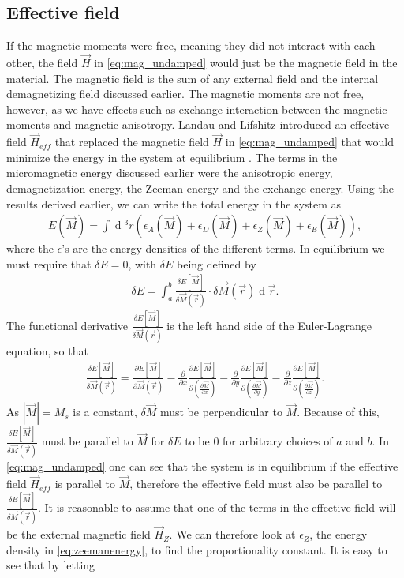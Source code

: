 \documentclass[12pt, a4paper, twoside, openright]{article}		%
\renewcommand{\d}[1]{\ensuremath{\operatorname{d}\!{#1}}}
\numberwithin{equation}{section}
\begin{document}
\subsection{Effective field}
If the magnetic moments were free, meaning they did not interact with each other, the field $\vec{H}$ in \eqref{eq:mag_undamped} would just be the magnetic field in the material. The magnetic field is the sum of any external field and the internal demagnetizing field discussed earlier. The magnetic moments are not free, however, as we have effects such as exchange interaction between the magnetic moments and magnetic anisotropy. Landau and Lifshitz introduced an effective field $\vec{H}_{eff}$ that replaced the magnetic field $\vec{H}$ in \eqref{eq:mag_undamped} that would minimize the energy in the system at equilibrium \cite{LandauLifshitz1935}. The terms in the micromagnetic energy discussed earlier were the anisotropic energy, demagnetization energy, the Zeeman energy and the exchange energy. Using the results derived earlier, we can write the total energy in the system as
\begin{align}
\label{eq:micromagneticenergy}
E(\vec{M}) = \int \d {^3} r \left(\epsilon_A(\vec{M}) + \epsilon_D(\vec{M}) + \epsilon_Z(\vec{M}) + \epsilon_E(\vec{M})\right),
\end{align}
where the $\epsilon$'s are the energy densities of the different terms. In equilibrium we must require that $\delta E=0$, with $\delta E$ being defined by
\begin{align}
\label{eq:deltaE}
\delta E = \int_a^b \frac{\delta E[\vec{M}]}{\delta \vec{M}(\vec{r})}\cdot \delta \vec{M}(\vec{r}) \d {\vec{r}}.
\end{align}
The functional derivative $\frac{\delta E[\vec{M}]}{\delta \vec{M}(\vec{r})}$ is the left hand side of the Euler-Lagrange equation, so that
\begin{align}
\label{eq:functionaldiff}
\frac{\delta E[\vec{M}]}{\delta \vec{M}(\vec{r})} = \frac{\partial E[\vec{M}]}{\partial \vec{M}(\vec{r})} - \frac{\partial}{\partial x} \frac{\partial E[\vec{M}]}{\partial (\frac{\partial \vec{M}}{\partial x})} - \frac{\partial}{\partial y} \frac{\partial E[\vec{M}]}{\partial (\frac{\partial \vec{M}}{\partial y})} - \frac{\partial}{\partial z} \frac{\partial E[\vec{M}]}{\partial (\frac{\partial \vec{M}}{\partial z})}.
\end{align}
As $|\vec{M}| = M_s$ is a constant, $\delta \vec{M}$ must be perpendicular to $\vec{M}$. Because of this, $\frac{\delta E[\vec{M}]}{\delta \vec{M}(\vec{r})}$ must be parallel to $\vec{M}$ for $\delta E$ to be 0 for arbitrary choices of $a$ and $b$. In \eqref{eq:mag_undamped} one can see that the system is in equilibrium if the effective field $\vec{H}_{eff}$ is parallel to $\vec{M}$, therefore the effective field must also be parallel to $\frac{\delta E[\vec{M}]}{\delta \vec{M}(\vec{r})}$. It is reasonable to assume that one of the terms in the effective field will be the external magnetic field $\vec{H}_Z$. We can therefore look at $\epsilon_Z$, the energy density in \eqref{eq:zeemanenergy}, to find the proportionality constant. It is easy to see that by letting
\end{document}
